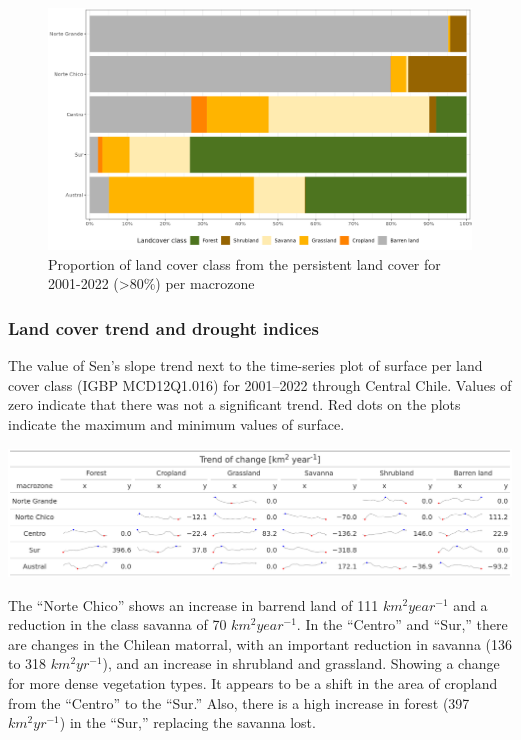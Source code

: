 \documentclass[
  number,
  preprint,
  3p,
  onecolumn]{elsarticle}
\begin{document}
\begin{figure}[!ht]

{\centering \includegraphics{../output/figs/LC_pers80_per_macrozone.png}

}

\caption{\label{fig-LCprop}Proportion of land cover class from the
persistent land cover for 2001-2022 (\textgreater80\%) per macrozone}

\end{figure}

\hypertarget{land-cover-trend-and-drought-indices-1}{%
\subsubsection{Land cover trend and drought
indices}\label{land-cover-trend-and-drought-indices-1}}

\begin{table}[!ht]
\caption{The value of Sen's slope trend next to the time-series plot of surface per land cover class (IGBP MCD12Q1.016) for 2001–2022 through Central Chile. Values of zero indicate that there was not a significant trend. Red dots on the plots indicate the maximum and minimum values of surface.}
\label{tab-land coverTrend}
\includegraphics[]{../output/figs/table_var_landcover_macro.png}
\end{table}

The ``Norte Chico'' shows an increase in barrend land of 111
\(km^2 year^{-1}\) and a reduction in the class savanna of 70
\(km^2 year^{-1}\). In the ``Centro'' and ``Sur,'' there are changes in
the Chilean matorral, with an important reduction in savanna (136 to 318
\(km^2 yr^{-1}\)), and an increase in shrubland and grassland. Showing a
change for more dense vegetation types. It appears to be a shift in the
area of cropland from the ``Centro'' to the ``Sur.'' Also, there is a
high increase in forest (397 \(km^2 yr^{-1}\)) in the ``Sur,'' replacing
the savanna lost.
\end{document}
